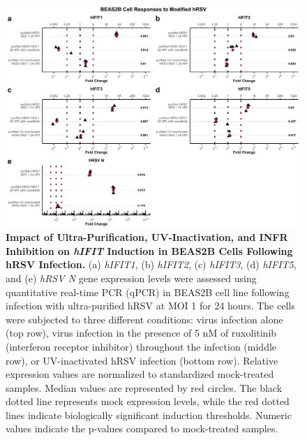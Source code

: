 \begin{figure}
    \centering
    \includegraphics[width=1\linewidth]{06. Chapter 1/Figs/01. Induction/08. beas2b_hrsv.pdf}
    \caption[Impact of Ultra-Purification, UV-Inactivation, and INFR Inhibition on \textit{hIFIT} Induction in BEAS2B Cells Following hRSV Infection.]{\textbf{Impact of Ultra-Purification, UV-Inactivation, and INFR Inhibition on \textit{hIFIT} Induction in BEAS2B Cells Following hRSV Infection.} (a) \textit{hIFIT1}, (b) \textit{hIFIT2}, (c) \textit{hIFIT3}, (d) \textit{hIFIT5}, and (e) \textit{hRSV N} gene expression levels were assessed using quantitative real-time PCR (qPCR) in BEAS2B cell line following infection with ultra-purified hRSV at MOI 1 for 24 hours. The cells were subjected to three different conditions: virus infection alone (top row), virus infection in the presence of 5 nM of ruxolitinib (interferon receptor inhibitor) throughout the infection (middle row), or UV-inactivated hRSV infection (bottom row). Relative expression values are normalized to standardized mock-treated samples. Median values are represented by red circles. The black dotted line represents mock expression levels, while the red dotted lines indicate biologically significant induction thresholds. Numeric values indicate the p-values compared to mock-treated samples.}
    \label{fig:The effect of ultra-purification, UV-inactivation and INFR inhibition on hIFIT induction following hRSV infection in BEAS2B}
\end{figure}

